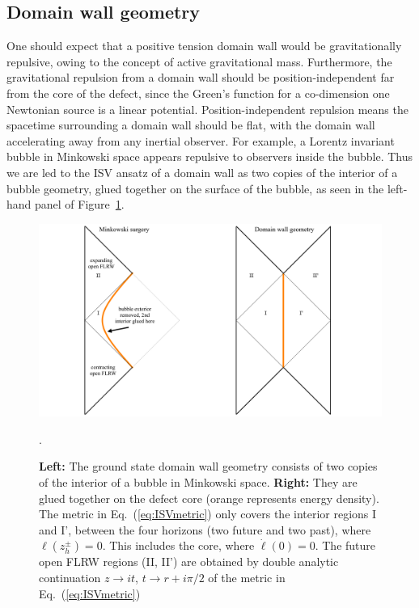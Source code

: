 \documentclass[aps,amsfonts,amsmath,prd,preprint,nofootinbib,superscriptaddress]{revtex4}
\begin{document}
\begin{appendix}
\subsection{Domain wall geometry}
One should expect that a positive tension domain wall would be gravitationally repulsive, owing to the concept of active gravitational mass.  Furthermore, 
the gravitational repulsion from a domain wall should be position-independent far from the core of the defect, since the Green's function for a co-dimension one Newtonian
source is a linear potential.  Position-independent repulsion means the spacetime surrounding a domain wall should be flat, with the domain wall accelerating away from any inertial observer.  
For example, a Lorentz invariant bubble in Minkowski space appears repulsive to observers inside the bubble.  Thus we are led to the ISV ansatz
of a domain wall as two copies of the interior of a bubble geometry, glued together on the surface of the bubble, as seen in the left-hand panel of Figure~\ref{fig:ISV}.
\begin{figure}[htbp]
\begin{center}
\includegraphics[width=1\textwidth]{figures/ISVbubble}
\caption{{\bf Left:} The ground state domain wall geometry consists of two copies of the interior of a bubble in Minkowski space.    {\bf Right:} They are glued together on the defect core (orange represents energy density). 
The metric in Eq.~(\ref{eq:ISVmetric}) only covers the interior regions I and I', between the four horizons (two future and two past), where $\ell(z_h^\pm) = 0$.  This includes the core, where $\dot\ell(0) = 0$. The future open FLRW regions (II, II') are obtained by
double analytic continuation $z\to i t$, $t \to r + i\pi/2$ of the metric in Eq.~(\ref{eq:ISVmetric})}.
\label{fig:ISV}
\end{center}
\end{figure}



\end{appendix}
\end{document}

